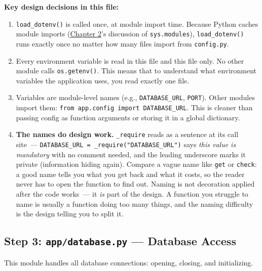 \noindent{}\textbf{Key design decisions in this file:}

\begin{enumerate}
\def\labelenumi{\arabic{enumi}.}
\item
  \texttt{load\_dotenv()} is called once, at module import time. Because Python caches module imports (\hyperref[ch:02-runtime-initialization]{Chapter 2}'s discussion of \texttt{sys.modules}), \texttt{load\_dotenv()} runs exactly once no matter how many files import from \texttt{config.py}.
\item
  Every environment variable is read in this file and this file only. No other module calls \texttt{os.getenv()}. This means that to understand what environment variables the application uses, you read exactly one file.
\item
  Variables are module-level names (e.g., \texttt{DATABASE\_URL}, \texttt{PORT}). Other modules import them: \texttt{from\ app.}\allowbreak{}\texttt{config\ import\ DATABASE\_}\allowbreak{}\texttt{URL}. This is cleaner than passing config as function arguments or storing it in a global dictionary.
\item
  \textbf{The names do design work.} \texttt{\_require} reads as a sentence at its call site~--- \texttt{DATABASE\_}\allowbreak{}\texttt{URL\ =}\allowbreak{}\texttt{\ \_}\allowbreak{}\texttt{require("DATABASE\_}\allowbreak{}\texttt{URL")} says \emph{this value is mandatory} with no comment needed, and the leading underscore marks it private (information hiding again). Compare a vague name like \texttt{get} or \texttt{check}: a good name tells you what you get back and what it costs, so the reader never has to open the function to find out. Naming is not decoration applied after the code works~--- it \emph{is} part of the design. A function you struggle to name is usually a function doing too many things, and the naming difficulty is the design telling you to split it.
\end{enumerate}

\subsection*{\texorpdfstring{Step 3: \texttt{app/database.py} --- Database Access}{Step 3: app/database.py --- Database Access}}\label{15-structuring-the-application:step-3-appdatabasepy--database-access}

This module handles all database connections: opening, closing, and initializing.

